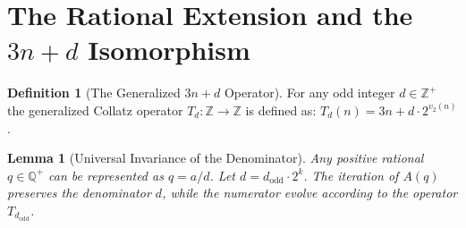 \documentclass[11pt, a4paper]{article}
\newtheorem{lemma}[theorem]{Lemma}
\theoremstyle{definition}
\newtheorem{definition}[theorem]{Definition}
\begin{document}
\section{The Rational Extension and the \texorpdfstring{$3n+d$}{3n+d} Isomorphism}

\begin{definition}[The Generalized $3n+d$ Operator]
For any odd integer $d \in \mathbb{Z}^{+}$ the generalized Collatz operator $T_d : \mathbb{Z} \rightarrow \mathbb{Z}$ is defined as:
$T_d(n) = 3n + d \cdot 2^{v_2(n)}$.
\end{definition}

\begin{lemma}[Universal Invariance of the Denominator]
\label{lem:denominator}
Any positive rational $q \in \mathbb{Q}^{+}$ can be represented as $q = a/d$. Let $d = d_{\text{odd}} \cdot 2^{k}$. The iteration of $A(q)$ preserves the denominator $d$, while the numerator evolve according to the operator $T_{d_{\text{odd}}}$.
\end{lemma}
\end{document}
